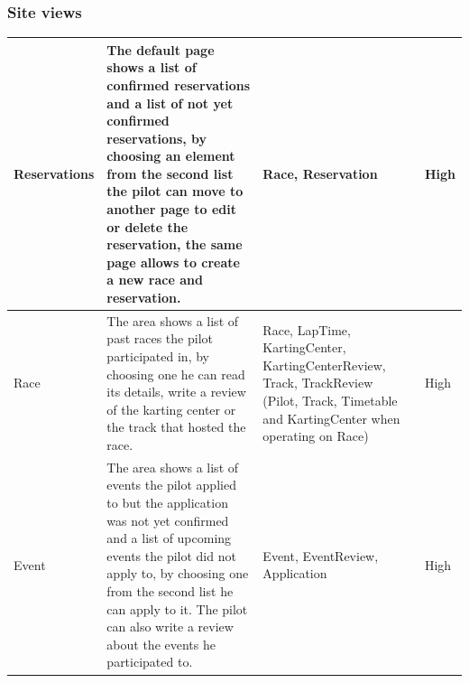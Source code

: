 \documentclass{beamer}
\begin{document}
\begin{frame}
    \frametitle{Site views}
    \begin{table}
        \centering
        \tiny
        \setlength{\tabcolsep}{1pt}
        \begin{tabular}{|m{2cm}|m{4cm}|m{3cm}|m{1cm}|}
        \hline
        Reservations & The default page shows a list of confirmed reservations and a list of not yet confirmed reservations,
        by choosing an element from the second list the pilot can move to another page to edit or delete the reservation, the same page allows
        to create a new race and reservation.
         & Race, Reservation & High \\
        \hline
        Race & The area shows a list of past races the pilot participated in, by choosing one he can read its details,
        write a review of the karting center or the track that hosted the race.
         & Race, LapTime, KartingCenter, KartingCenterReview, Track, TrackReview
        (Pilot, Track, Timetable and KartingCenter when operating on Race) & High \\
        \hline
        Event & The area shows a list of events the pilot applied to but 
        the application was not yet confirmed and 
        a list of upcoming events the pilot did not apply to, by choosing one from the second list
         he can apply to it. The pilot can also write a review about the events he participated to.
         & Event, EventReview, Application & High \\
        \hline
        \end{tabular}
    \end{table}
\end{frame}
\end{document}
